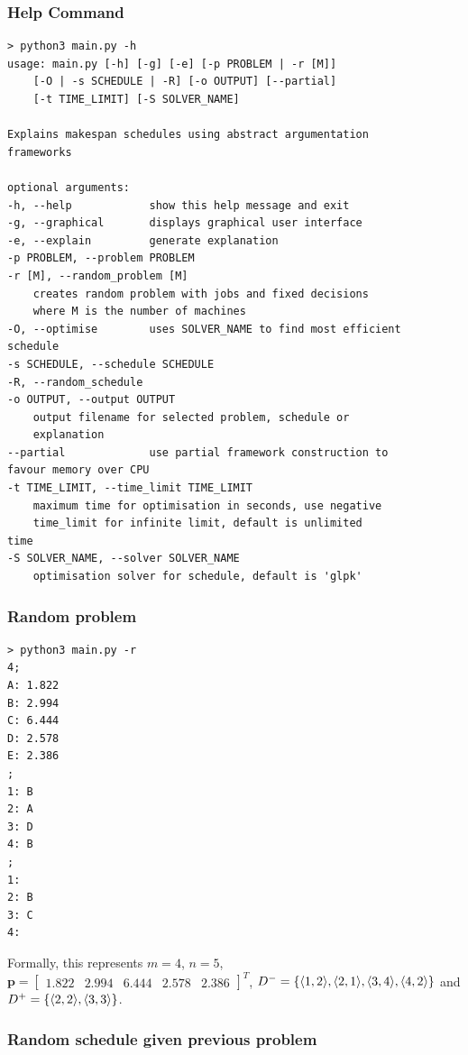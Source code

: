 \subsubsection{Help Command}

\begin{verbatim}
> python3 main.py -h
usage: main.py [-h] [-g] [-e] [-p PROBLEM | -r [M]]
    [-O | -s SCHEDULE | -R] [-o OUTPUT] [--partial]
    [-t TIME_LIMIT] [-S SOLVER_NAME]

Explains makespan schedules using abstract argumentation
frameworks

optional arguments:
-h, --help            show this help message and exit
-g, --graphical       displays graphical user interface
-e, --explain         generate explanation
-p PROBLEM, --problem PROBLEM
-r [M], --random_problem [M]
    creates random problem with jobs and fixed decisions
    where M is the number of machines
-O, --optimise        uses SOLVER_NAME to find most efficient
schedule
-s SCHEDULE, --schedule SCHEDULE
-R, --random_schedule
-o OUTPUT, --output OUTPUT
    output filename for selected problem, schedule or
    explanation
--partial             use partial framework construction to
favour memory over CPU
-t TIME_LIMIT, --time_limit TIME_LIMIT
    maximum time for optimisation in seconds, use negative
    time_limit for infinite limit, default is unlimited
time
-S SOLVER_NAME, --solver SOLVER_NAME
    optimisation solver for schedule, default is 'glpk'
\end{verbatim}

\subsubsection{Random problem}

\begin{verbatim}
> python3 main.py -r
4;
A: 1.822
B: 2.994
C: 6.444
D: 2.578
E: 2.386
;
1: B
2: A
3: D
4: B
;
1: 
2: B
3: C
4:
\end{verbatim}

Formally, this represents $m=4$, $n=5$, $\mathbf{p}=\begin{bmatrix}
	1.822&2.994&6.444&2.578&2.386
\end{bmatrix}^T$, $D^-=\{\langle{1},{2}\rangle,\langle{2},{1}\rangle,\langle{3},{4}\rangle,\langle{4},{2}\rangle\}$ and $D^+=\{\langle{2},{2}\rangle, \langle{3},{3}\rangle\}$.

\subsubsection{Random schedule given previous problem}

